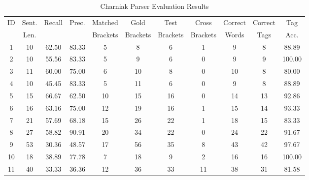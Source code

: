 \begin{table*}[htbp!]
\centering
\begin{tabular}{@{}ccccccccccc@{}}
\toprule
ID & Sent. & Recall & Prec. & Matched & Gold & Test & Cross & Correct & Correct & Tag \\
 & Len. & & & Brackets & Brackets & Brackets & Brackets & Words & Tags & Acc. \\
\midrule
1 & 10 & 62.50 & 83.33 & 5 & 8 & 6 & 1 & 9 & 8 & 88.89 \\
2 & 10 & 55.56 & 83.33 & 5 & 9 & 6 & 0 & 9 & 9 & 100.00 \\
3 & 11 & 60.00 & 75.00 & 6 & 10 & 8 & 0 & 10 & 8 & 80.00 \\
4 & 10 & 45.45 & 83.33 & 5 & 11 & 6 & 0 & 9 & 8 & 88.89 \\
5 & 15 & 66.67 & 62.50 & 10 & 15 & 16 & 0 & 14 & 13 & 92.86 \\
6 & 16 & 63.16 & 75.00 & 12 & 19 & 16 & 1 & 15 & 14 & 93.33 \\
7 & 21 & 57.69 & 68.18 & 15 & 26 & 22 & 1 & 18 & 15 & 83.33 \\
8 & 27 & 58.82 & 90.91 & 20 & 34 & 22 & 0 & 24 & 22 & 91.67 \\
9 & 53 & 30.36 & 48.57 & 17 & 56 & 35 & 8 & 43 & 42 & 97.67 \\
10 & 18 & 38.89 & 77.78 & 7 & 18 & 9 & 2 & 16 & 16 & 100.00 \\
11 & 40 & 33.33 & 36.36 & 12 & 36 & 33 & 11 & 38 & 31 & 81.58 \\
\bottomrule
\end{tabular}
\caption{Charniak Parser Evaluation Results}
\label{tab:parser_eval}
\end{table*}
